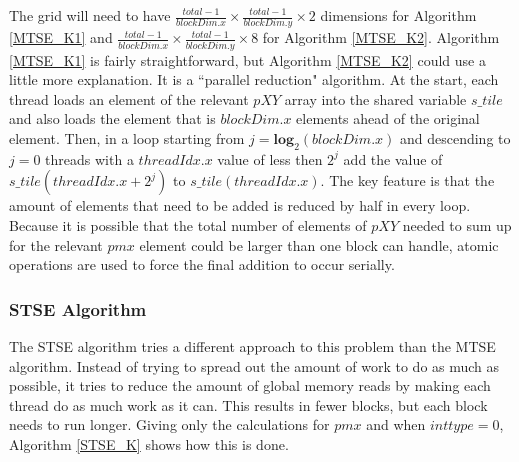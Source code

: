 The grid will need to have $\frac{total - 1}{blockDim.x} \times \frac{total - 1}{blockDim.y} \times 2$ dimensions for Algorithm \ref{MTSE_K1} and $\frac{total - 1}{blockDim.x} \times \frac{total - 1}{blockDim.y} \times 8$ for Algorithm \ref{MTSE_K2}. Algorithm \ref{MTSE_K1} is fairly straightforward, but Algorithm \ref{MTSE_K2} could use a little more explanation. It is a ``parallel reduction" algorithm. At the start, each thread loads an element of the relevant $pXY$ array into the shared variable $s\_tile$ and also loads the element that is $blockDim.x$ elements ahead of the original element. Then, in a loop starting from $j= \textbf{log}_{2}(blockDim.x)$ and descending to $j = 0$ threads with a $threadIdx.x$ value of less then $2^{j}$ add the value of  $s\_tile(threadIdx.x + 2^{j})$ to $s\_tile(threadIdx.x)$. The key feature is that the amount of elements that need to be added is reduced by half in every loop. Because it is possible that the total number of elements of $pXY$ needed to sum up for the relevant $pmx$ element could be larger than one block can handle, atomic operations are used to force the final addition to occur serially.

\subsubsection{STSE Algorithm}
The STSE algorithm tries a different approach to this problem than the MTSE algorithm. Instead of trying to spread out the amount of work to do as much as possible, it tries to reduce the amount of global memory reads by making each thread do as much work as it can. This results in fewer blocks, but each block needs to run longer. Giving only the calculations for $pmx$ and when $inttype = 0$, Algorithm \ref{STSE_K} shows how this is done.

